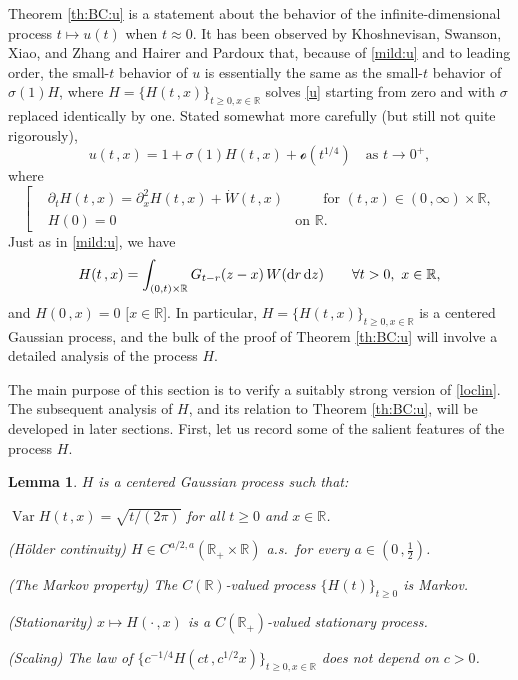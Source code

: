 \documentclass[reqno]{amsart}
\DeclareMathOperator{\Var}{Var}
\newcommand{\<}{\langle}
\renewcommand{\>}{\rangle}
\newcommand{\R}{\mathbb{R}}
\newcommand{\1}{\mathbb{1}}
\renewcommand{\d}{{\rm d}}
\renewcommand{\ge}{\geqslant}
\newtheorem{lemma}[stat]{Lemma}
\theoremstyle{definition}
\numberwithin{equation}{section}
\begin{document}
Theorem \ref{th:BC:u} is a statement about the behavior of the infinite-dimensional
process $t\mapsto u(t)$ when $t\approx0$. It has been observed by
Khoshnevisan, Swanson, Xiao, and Zhang \cite{KSXZ}
and Hairer and Pardoux \cite{HairerPardoux}
that, because of \eqref{mild:u} and to leading order,
the small-$t$ behavior of $u$ is essentially the same as the small-$t$ behavior of
$\sigma(1)H$, where $H=\{H(t\,,x)\}_{t\ge0,x\in\R}$ solves \eqref{u} starting from zero
and with $\sigma$ replaced identically by one. Stated somewhat more carefully (but
still not quite rigorously),
\begin{equation}\label{loclin}
	u(t\,,x) = 1 + \sigma(1)H(t\,,x) + \mathscr{o}(t^{1/4})
	\quad\text{as $t\to0^+$},
\end{equation}
where
\begin{equation}\label{H}\left[\begin{aligned}
	&\partial_t H(t\,,x) = \partial^2_x H(t\,,x) + \dot{W}(t\,,x) &\qquad
		\text{for $(t\,,x)\in(0\,,\infty)\times\R$},\\
	&H(0) =  0&\text{on $\R$}.
\end{aligned}\right.\end{equation}
Just as in \eqref{mild:u}, we have
\begin{align}\label{mild:H}
	H(t\,, x) = \int_{(0, t) \times \R} G_{t-r}(z-x)\, W(\d r\, \d z)
	\qquad\forall t>0,\ x\in\R,
\end{align}
and $H(0\,,x)=0$ $[x\in\R$]. In particular, $H=\{H(t\,,x)\}_{t\ge0,x\in\R}$ is a 
centered Gaussian process, and the bulk of the proof of Theorem \ref{th:BC:u}
will involve a detailed analysis of the process $H$. 

The main purpose of this section is to
verify a suitably strong version of \eqref{loclin}.
The subsequent analysis of $H$, and its relation to Theorem \ref{th:BC:u},
will be developed in later sections.
First, let us record some of the salient features of the process $H$.

\begin{lemma}\label{lem:H}
	$H$ is a centered Gaussian process such that: 
	\begin{compactenum}
		\item $\Var H(t\,,x)
			=\sqrt{t/(2\pi)}$ for all $t\ge0$ and $x\in\R$.
		\item (H\"older continuity) $H\in C^{a/2,a}(\R_+\times\R)$ a.s.\ for every
			$a\in(0\,,\frac12)$.
		\item (The Markov property) The $C(\R)$-valued process $\{H(t)\}_{t\ge0}$
			is Markov.
		\item (Stationarity) $x\mapsto H(\cdot\,,x)$ is a $C(\R_+)$-valued stationary process.
		\item (Scaling) The law of
			$\{ c^{-1/4}H(ct\,,c^{1/2} x)\}_{t\ge0,x\in\R}$ does not depend on $c>0$.
	\end{compactenum}
\end{lemma}
\end{document}
